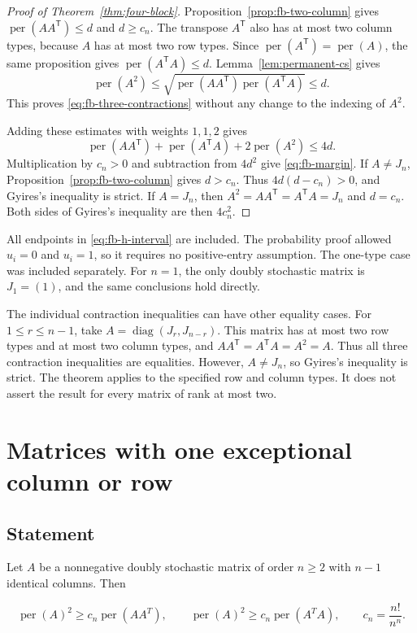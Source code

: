 \documentclass[11pt,a4paper]{article}
\theoremstyle{definition}
\theoremstyle{remark}
\newcommand{\per}{\operatorname{per}}
\newcommand{\T}{\mathsf{T}}
\begin{document}
\begin{proof}[Proof of Theorem~\ref{thm:four-block}]
Proposition~\ref{prop:fb-two-column} gives
$\per(AA^\T)\leq d$ and $d\geq c_n$.
The transpose $A^\T$ also has at most two column types, because
$A$ has at most two row types. Since $\per(A^\T)=\per(A)$,
the same proposition gives $\per(A^\T A)\leq d$.
Lemma~\ref{lem:permanent-cs} gives
\[
 \per(A^2)
 \leq\sqrt{\per(AA^\T)\per(A^\T A)}
 \leq d.
\]
This proves \eqref{eq:fb-three-contractions} without any change
to the indexing of $A^2$.

Adding these estimates with weights $1,1,2$ gives
\[
 \per(AA^\T)+\per(A^\T A)+2\per(A^2)\leq4d.
\]
Multiplication by $c_n>0$ and subtraction from $4d^2$ give
\eqref{eq:fb-margin}. If $A\ne J_n$,
Proposition~\ref{prop:fb-two-column} gives $d>c_n$.
Thus $4d(d-c_n)>0$, and Gyires's inequality is strict.
If $A=J_n$, then $A^2=AA^\T=A^\T A=J_n$ and $d=c_n$.
Both sides of Gyires's inequality are then $4c_n^2$.
\end{proof}

All endpoints in \eqref{eq:fb-h-interval} are included.
The probability proof allowed $u_i=0$ and $u_i=1$, so it requires
no positive-entry assumption. The one-type case was included
separately. For $n=1$, the only doubly stochastic matrix is
$J_1=(1)$, and the same conclusions hold directly.

The individual contraction inequalities can have other equality
cases. For $1\leq r\leq n-1$, take
$A=\operatorname{diag}(J_r,J_{n-r})$.
This matrix has at most two row types and at most two column types,
and $AA^\T=A^\T A=A^2=A$. Thus all three contraction inequalities
are equalities. However, $A\ne J_n$, so Gyires's inequality is strict.
The theorem applies to the specified row and column types.
It does not assert the result for every matrix of rank at most two.

\section{Matrices with one exceptional column or
row}\label{sec:one-special}

\subsection{Statement}\label{special-statement}

Let \(A\) be a nonnegative doubly stochastic matrix of order \(n\ge2\)
with \(n-1\) identical columns. Then

\begin{equation}\label{eq:e-1}
\operatorname{per}(A)^2\ge c_n\operatorname{per}(AA^T),
\qquad
\operatorname{per}(A)^2\ge c_n\operatorname{per}(A^TA),
\qquad c_n=\frac{n!}{n^n}.
\end{equation}
\end{document}
